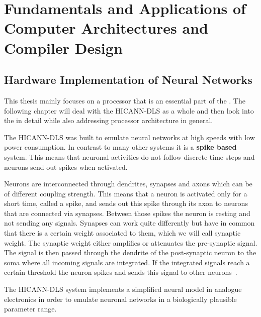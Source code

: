 \chapter{Fundamentals and Applications of Computer Architectures and Compiler Design}
\label{ch:methods}

\section{Hardware Implementation of Neural Networks}
This thesis mainly focuses on a processor that is an essential part of the .
The following chapter will deal with the \ac{HICANN-DLS} as a whole and then look into the  in detail while also addressing processor architecture in general.

The \ac{HICANN-DLS} was built to emulate neural networks at high speeds with low power consumption.
In contrast to many other systems  it is a \textbf{spike based} system.
This means that neuronal activities do not follow discrete time steps and neurons send out spikes when activated.

Neurons are interconnected through dendrites, synapses and axons which can be of different coupling strength. 
This means that a neuron is activated only for a short time, called a spike, and sends out this spike through its axon to neurons that are connected via synapses.
Between those spikes the neuron is resting and not sending any signals.
Synapses can work quite differently but have in common that there is a certain weight associated to them, which we will call synaptic weight.
The synaptic weight either amplifies or attenuates the pre-synaptic signal.
The signal is then passed through the dendrite of the post-synaptic neuron to the soma where all incoming signals are integrated.
If the integrated signals reach a certain threshold the neuron spikes and sends this signal to other neurons~\citep{silbernagl2009color}.

The \ac{HICANN-DLS} system implements a simplified neural model in analogue electronics in order to emulate neuronal networks in a biologically plausible parameter range.

